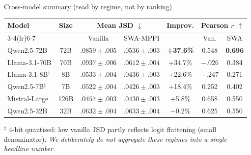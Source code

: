 \documentclass[10pt,aspectratio=169]{beamer}
\newcommand{\gain}[1]{\textcolor{gaingreen}{#1}}
\newcommand{\loss}[1]{\textcolor{lossred}{#1}}
\begin{document}
\begin{frame}{Cross-model summary (read by regime, not by ranking)}
  \centering\small
  \begin{tabular}{lcccccc}
    \toprule
    \multirow{2}{*}{\textbf{Model}} & \multirow{2}{*}{\textbf{Size}} &
      \multicolumn{2}{c}{\textbf{Mean JSD} $\downarrow$} &
      \multirow{2}{*}{\textbf{Improv.}} &
      \multicolumn{2}{c}{\textbf{Pearson $r$} $\uparrow$} \\
    \cmidrule(lr){3-4}\cmidrule(lr){6-7}
     & & Vanilla & SWA-MPPI & & Van. & SWA \\
    \midrule
    Qwen2.5-72B   & 72B  & $.0859\!\pm\!.005$ & $.0536\!\pm\!.003$ & \gain{\textbf{+37.6\%}} & 0.548 & \textbf{0.696} \\
    Llama-3.1-70B & 70B  & $.0937\!\pm\!.006$ & $.0612\!\pm\!.004$ & \gain{+34.7\%} & $-$.026 & 0.384 \\
    Llama-3.1-8B$^\ddagger$  & 8B   & $.0533\!\pm\!.004$ & $.0436\!\pm\!.003$ & \gain{+22.6\%} & $-$.247 & 0.271 \\
    Qwen2.5-7B$^\ddagger$    & 7B   & $.0522\!\pm\!.004$ & $.0426\!\pm\!.003$ & \gain{+18.4\%} & 0.252  & 0.402 \\
    Mistral-Large & 126B & $.0457\!\pm\!.003$ & $.0430\!\pm\!.003$ & \gain{+5.8\%}  & 0.658  & 0.550 \\
    Qwen2.5-32B   & 32B  & $.0632\!\pm\!.004$ & $.0633\!\pm\!.004$ & \loss{$-$0.2\%} & 0.625 & 0.550 \\
    \bottomrule
  \end{tabular}
  \vspace{0.4em}

  \footnotesize $^\ddagger$ 4-bit quantised: low vanilla JSD partly reflects logit flattening (small denominator).
  \emph{We deliberately do not aggregate these regimes into a single headline number.}
\end{frame}
\end{document}
